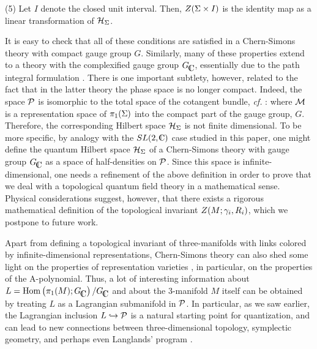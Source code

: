 \item{(5)}
Let $I$ denote the closed unit interval.
Then, $Z ({\Sigma} \times I)$ is the identity map as a linear
transformation of ${\cal H}_{{\Sigma}}$.

It is easy to check that all of these conditions are satisfied
in a Chern-Simons theory with compact gauge group $G$.
Similarly, many of these properties extend
to a theory with the complexified gauge group $\CCG$,
essentially due to the path integral formulation \zpathint.
There is one important subtlety, however, related to the fact
that in the latter theory the phase space
%
\eqn{}
%
is no longer compact.
Indeed, the space ${\cal P}$ is isomorphic to the total
space of the cotangent bundle, {\it cf.} \pcot:
%
\eqn{}
%
where ${\cal M}$ is a representation space of $\pi_1 ({\Sigma})$
into the compact part of the gauge group, $G$.
Therefore, the corresponding Hilbert space ${\cal H}_{{\Sigma}}$
is not finite dimensional.
To be more specific, by analogy with the $SL(2,\IC)$ case
studied in this paper, one might define the quantum Hilbert
space ${\cal H}_{{\Sigma}}$ of a Chern-Simons theory with gauge group $\CCG$
as a space of half-densities on ${\cal P}$.
Since this space is infinite-dimensional, one needs a refinement
of the above definition in order to prove that we deal with
a topological quantum field theory in a mathematical sense.
Physical considerations suggest, however, that there exists
a rigorous mathematical definition of the topological
invariant $Z(M;\gamma_i, R_i)$, which we postpone to future work.


%

 \medskip


Apart from defining a topological invariant of
three-manifolds with links colored by infinite-dimensional
representations, Chern-Simons theory can also shed some light
on the properties of representation varieties \generall,
in particular, on the properties of the A-polynomial.
Thus, a lot of interesting information about
$L = \Hom \left(\pi_1(M); \CCG \right)/ \CCG$
and about the 3-manifold $M$ itself can be obtained by
treating $L$ as a Lagrangian submanifold in ${\cal P}$.
In particular, as we saw earlier,
the Lagrangian inclusion $L \hookrightarrow {\cal P}$
is a natural starting point for quantization,
and can lead to new connections between
three-dimensional topology, symplectic geometry,
and perhaps even Langlands' program \Beilinson.

